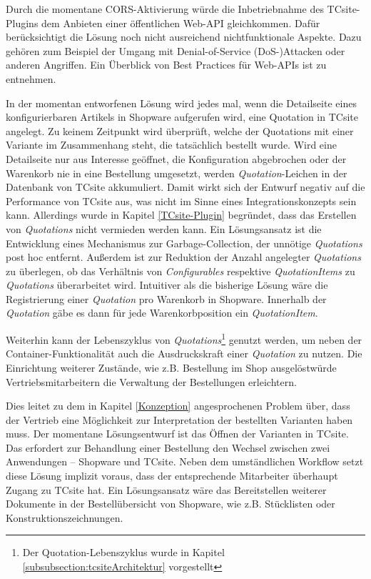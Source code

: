\documentclass[11pt, a4paper, titlepage, listof=totoc, bibliography=totoc, index=totoc, twoside, openright, headings=normal]{scrreprt}
\begin{document}
Durch die momentane CORS-Aktivierung würde die Inbetriebnahme des TCsite-Plugins dem Anbieten einer öffentlichen Web-API gleichkommen. Dafür berücksichtigt die Lösung noch nicht ausreichend nichtfunktionale Aspekte. Dazu gehören zum Beispiel der Umgang mit Denial-of-Service (DoS-)Attacken oder anderen Angriffen. Ein Überblick von Best Practices für Web-APIs ist \citet{tilkov11} zu entnehmen.

In der momentan entworfenen Lösung wird jedes mal, wenn die Detailseite eines konfigurierbaren Artikels in Shopware aufgerufen wird, eine Quotation in TCsite angelegt. Zu keinem Zeitpunkt wird überprüft, welche der Quotations mit einer Variante im Zusammenhang steht, die tatsächlich bestellt wurde. Wird eine Detailseite nur aus Interesse geöffnet, die Konfiguration abgebrochen oder der Warenkorb nie in eine Bestellung umgesetzt, werden \glqq \emph{Quotation}-Leichen\grqq{} in der Datenbank von TCsite akkumuliert. Damit wirkt sich der Entwurf negativ auf die Performance von TCsite aus, was nicht im Sinne eines Integrationskonzepts sein kann. Allerdings wurde in Kapitel \ref{TCsite-Plugin} begründet, dass das Erstellen von \emph{Quotations} nicht vermieden werden kann. Ein Lösungsansatz ist die Entwicklung eines Mechanismus zur Garbage-Collection, der unnötige \emph{Quotations} post hoc entfernt. Außerdem ist zur Reduktion der Anzahl angelegter \emph{Quotations} zu überlegen, ob das Verhältnis von \emph{Configurables} respektive \emph{QuotationItems} zu \emph{Quotations} überarbeitet wird. Intuitiver als die bisherige Lösung wäre die Registrierung einer \emph{Quotation} pro Warenkorb in Shopware. Innerhalb der \emph{Quotation} gäbe es dann für jede Warenkorbposition ein \emph{QuotationItem}.

Weiterhin kann der Lebenszyklus von \emph{Quotations}\footnote{Der Quotation-Lebenszyklus wurde in Kapitel \ref{subsubsection:tcsiteArchitektur} vorgestellt} genutzt werden, um neben der Container-Funktionalität auch die Ausdruckskraft einer \emph{Quotation} zu nutzen. Die Einrichtung weiterer Zustände, wie z.B. \glqq Bestellung im Shop ausgelöst\grqq würde Vertriebsmitarbeitern die Verwaltung der Bestellungen erleichtern.

Dies leitet zu dem in Kapitel \ref{Konzeption} angesprochenen Problem über, dass der Vertrieb eine Möglichkeit zur Interpretation der bestellten Varianten haben muss. Der momentane Lösungsentwurf ist das Öffnen der Varianten in TCsite. Das erfordert zur Behandlung einer Bestellung den Wechsel zwischen zwei Anwendungen -- Shopware und TCsite. Neben dem umständlichen Workflow setzt diese Lösung implizit voraus, dass der entsprechende Mitarbeiter überhaupt Zugang zu TCsite hat. Ein Lösungsansatz wäre das Bereitstellen weiterer Dokumente in der Bestellübersicht von Shopware, wie z.B. Stücklisten oder Konstruktionszeichnungen.
\end{document}
